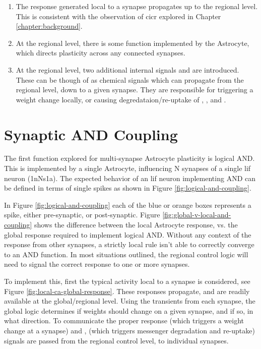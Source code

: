 \begin{enumerate}
\item The \ca response generated local to a synapse propagates up to the
  regional level. This is consistent with the observation of \Gls{cicr} explored in
  Chapter \ref{chapter:background}.
\item At the regional level, there is some function implemented by the
  Astrocyte, which directs plasticity across any connected synapses.
\item At the regional level, two additional internal signals \dser and
  \serca are introduced. These can be though of as chemical signals which can
  propagate from the regional level, down to a given synapse. They are
  responsible for triggering a weight change locally, or causing
  degredataion/re-uptake of \ipt, \kp, and \ca.
\end{enumerate}


\section{Synaptic AND Coupling}
The first function explored for multi-synapse Astrocyte plasticity is logical
AND. This is implemented by a single Astrocyte, influencing N synapses of a
single \Gls{lif} neuron (1nNs1a). The expected behavior of an \Gls{lif} neuron implementing
AND can be defined in terms of single spikes as shown in Figure
\ref{fig:logical-and-coupling}.


In Figure \ref{fig:logical-and-coupling} each of the blue or orange boxes
represents a spike, either pre-synaptic, or post-synaptic. Figure
\ref{fig:global-v-local-and-coupling} shows the difference between the local
Astrocyte response, vs. the global response required to implement logical
AND. Without any context of the response from other synapses, a strictly local
rule isn't able to correctly converge to an AND function. In most situations
outlined, the regional control logic will need to signal the correct response to
one or more synapses.

To implement this, first the typical activity local to a synapse is considered,
see Figure \ref{fig:local-ca-global-response}. These \ca responses propagate,
and are readily available at the global/regional level. Using the \ca transients
from each synapse, the global logic determines if weights should change on a
given synapse, and if so, in what direction. To communicate the proper response
\dser (which triggers a weight change at a synapse) and \serca, (which triggers
messenger degradation and re-uptake) signals are passed from the regional
control level, to individual synapses.

